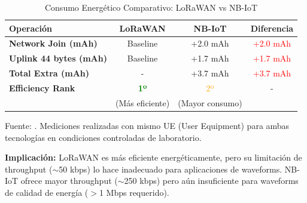 
\begin{table}[htbp]
\centering
\caption{Consumo Energético Comparativo: LoRaWAN vs NB-IoT}
\label{tab:lpwan_energy_consumption}
\begin{tabular}{|l|c|c|c|}
\hline
\textbf{Operación} & \textbf{LoRaWAN} & \textbf{NB-IoT} & \textbf{Diferencia} \\
\hline
\hline
\textbf{Network Join (mAh)} & Baseline & +2.0 mAh & \textcolor{red}{+2.0 mAh} \\
\hline
\textbf{Uplink 44 bytes (mAh)} & Baseline & +1.7 mAh & \textcolor{red}{+1.7 mAh} \\
\hline
\textbf{Total Extra (mAh)} & - & +3.7 mAh & \textcolor{red}{+3.7 mAh} \\
\hline
\textbf{Efficiency Rank} & \textcolor{green}{\textbf{1º}} & \textcolor{orange}{2º} & - \\
& (Más eficiente) & (Mayor consumo) & \\
\hline
\end{tabular}
\medskip

\small
Fuente: \cite{ugwuanyiSurveyIoTDeveloping2021}. Mediciones realizadas con mismo UE 
(User Equipment) para ambas tecnologías en condiciones controladas de laboratorio.

\medskip
\textbf{Implicación:} LoRaWAN es más eficiente energéticamente, pero su limitación 
de throughput ($\sim$50 kbps) lo hace inadecuado para aplicaciones de waveforms. 
NB-IoT ofrece mayor throughput ($\sim$250 kbps) pero aún insuficiente para waveforms 
de calidad de energía ($>$1 Mbps requerido).
\end{table}


